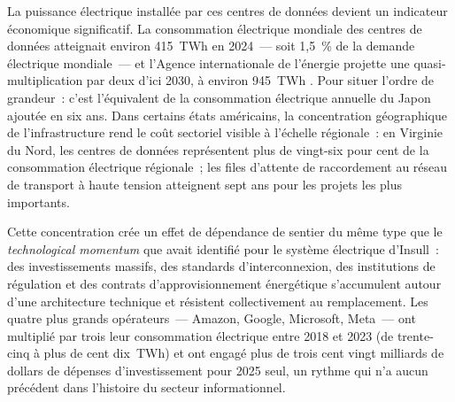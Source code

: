 %
La puissance électrique installée par ces centres de données devient un indicateur économique significatif. La consommation électrique mondiale des centres de données atteignait environ 415~TWh en 2024~--- soit 1,5~\% de la demande électrique mondiale~--- et l'Agence internationale de l'énergie projette une quasi-multiplication par deux d'ici 2030, à environ 945~TWh \parencite{iea_energy_ai_2025}. Pour situer l'ordre de grandeur~: c'est l'équivalent de la consommation électrique annuelle du Japon ajoutée en six ans. Dans certains états américains, la concentration géographique de l'infrastructure rend le coût sectoriel visible à l'échelle régionale~: en Virginie du Nord, les centres de données représentent plus de vingt-six pour cent de la consommation électrique régionale~; les files d'attente de raccordement au réseau de transport à haute tension atteignent sept ans pour les projets les plus importants.

%
Cette concentration crée un effet de dépendance de sentier du même type que le \emph{technological momentum} que \textcite{hughes_networks_1983} avait identifié pour le système électrique d'Insull~: des investissements massifs, des standards d'interconnexion, des institutions de régulation et des contrats d'approvisionnement énergétique s'accumulent autour d'une architecture technique et résistent collectivement au remplacement. Les quatre plus grands opérateurs~--- Amazon, Google, Microsoft, Meta~--- ont multiplié par trois leur consommation électrique entre 2018 et 2023 (de trente-cinq à plus de cent dix~TWh) et ont engagé plus de trois cent vingt milliards de dollars de dépenses d'investissement pour 2025 seul, un rythme qui n'a aucun précédent dans l'histoire du secteur informationnel.

